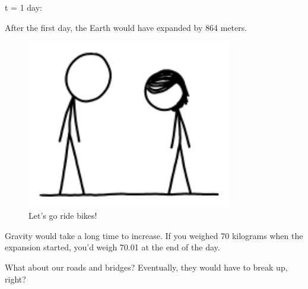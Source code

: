 {{t = 1 day:}

{After the first day, the Earth would have expanded by 864 meters.}

\begin{figure}[!htbp]
\centering
\includegraphics[scale=0.5, max width=0.8\textwidth]{imgs/a/67/expanding_day.png}
\caption{Let's go ride bikes!}
\end{figure}

{Gravity would take a long time to increase. If you weighed 70 kilograms when the expansion started, you'd weigh 70.01 at the end of the day.}

{What about our roads and bridges? Eventually, they would have to break up, right?}

}
